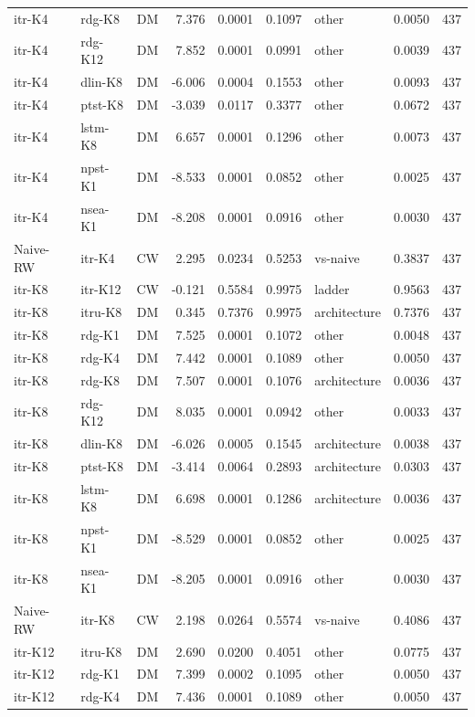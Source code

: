 \begin{table}[!t]
\begin{tabular}{llcrrrlrr}
itr-K4 & rdg-K8 & DM & 7.376 & 0.0001 & 0.1097 & other & 0.0050 & 437 \\
itr-K4 & rdg-K12 & DM & 7.852 & 0.0001 & 0.0991 & other & 0.0039 & 437 \\
itr-K4 & dlin-K8 & DM & -6.006 & 0.0004 & 0.1553 & other & 0.0093 & 437 \\
itr-K4 & ptst-K8 & DM & -3.039 & 0.0117 & 0.3377 & other & 0.0672 & 437 \\
itr-K4 & lstm-K8 & DM & 6.657 & 0.0001 & 0.1296 & other & 0.0073 & 437 \\
itr-K4 & npst-K1 & DM & -8.533 & 0.0001 & 0.0852 & other & 0.0025 & 437 \\
itr-K4 & nsea-K1 & DM & -8.208 & 0.0001 & 0.0916 & other & 0.0030 & 437 \\
Naive-RW & itr-K4 & CW & 2.295 & 0.0234 & 0.5253 & vs-naive & 0.3837 & 437 \\
itr-K8 & itr-K12 & CW & -0.121 & 0.5584 & 0.9975 & ladder & 0.9563 & 437 \\
itr-K8 & itru-K8 & DM & 0.345 & 0.7376 & 0.9975 & architecture & 0.7376 & 437 \\
itr-K8 & rdg-K1 & DM & 7.525 & 0.0001 & 0.1072 & other & 0.0048 & 437 \\
itr-K8 & rdg-K4 & DM & 7.442 & 0.0001 & 0.1089 & other & 0.0050 & 437 \\
itr-K8 & rdg-K8 & DM & 7.507 & 0.0001 & 0.1076 & architecture & 0.0036 & 437 \\
itr-K8 & rdg-K12 & DM & 8.035 & 0.0001 & 0.0942 & other & 0.0033 & 437 \\
itr-K8 & dlin-K8 & DM & -6.026 & 0.0005 & 0.1545 & architecture & 0.0038 & 437 \\
itr-K8 & ptst-K8 & DM & -3.414 & 0.0064 & 0.2893 & architecture & 0.0303 & 437 \\
itr-K8 & lstm-K8 & DM & 6.698 & 0.0001 & 0.1286 & architecture & 0.0036 & 437 \\
itr-K8 & npst-K1 & DM & -8.529 & 0.0001 & 0.0852 & other & 0.0025 & 437 \\
itr-K8 & nsea-K1 & DM & -8.205 & 0.0001 & 0.0916 & other & 0.0030 & 437 \\
Naive-RW & itr-K8 & CW & 2.198 & 0.0264 & 0.5574 & vs-naive & 0.4086 & 437 \\
itr-K12 & itru-K8 & DM & 2.690 & 0.0200 & 0.4051 & other & 0.0775 & 437 \\
itr-K12 & rdg-K1 & DM & 7.399 & 0.0002 & 0.1095 & other & 0.0050 & 437 \\
itr-K12 & rdg-K4 & DM & 7.436 & 0.0001 & 0.1089 & other & 0.0050 & 437 \\

\end{tabular}
\end{table}
